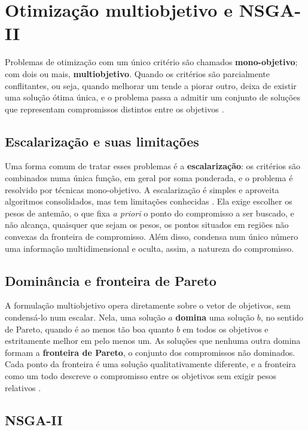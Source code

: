 \section{Otimização multiobjetivo e NSGA-II}
\label{sec: nsga2}

Problemas de otimização com um único critério são chamados \textbf{mono-objetivo}; com dois ou mais, \textbf{multiobjetivo}. Quando os critérios são parcialmente conflitantes, ou seja, quando melhorar um tende a piorar outro, deixa de existir uma solução ótima única, e o problema passa a admitir um conjunto de soluções que representam compromissos distintos entre os objetivos \cite{deb2001multiobjective}.

\subsection{Escalarização e suas limitações}

Uma forma comum de tratar esses problemas é a \textbf{escalarização}: os critérios são combinados numa única função, em geral por soma ponderada, e o problema é resolvido por técnicas mono-objetivo. A escalarização é simples e aproveita algoritmos consolidados, mas tem limitações conhecidas \cite{deb2001multiobjective}. Ela exige escolher os pesos de antemão, o que fixa \textit{a priori} o ponto do compromisso a ser buscado, e não alcança, quaisquer que sejam os pesos, os pontos situados em regiões não convexas da fronteira de compromisso. Além disso, condensa num único número uma informação multidimensional e oculta, assim, a natureza do compromisso.

\subsection{Dominância e fronteira de Pareto}

A formulação multiobjetivo opera diretamente sobre o vetor de objetivos, sem condensá-lo num escalar. Nela, uma solução $a$ \textbf{domina} uma solução $b$, no sentido de Pareto, quando é ao menos tão boa quanto $b$ em todos os objetivos e estritamente melhor em pelo menos um. As soluções que nenhuma outra domina formam a \textbf{fronteira de Pareto}, o conjunto dos compromissos não dominados. Cada ponto da fronteira é uma solução qualitativamente diferente, e a fronteira como um todo descreve o compromisso entre os objetivos sem exigir pesos relativos \cite{deb2001multiobjective}.

\subsection{NSGA-II}

